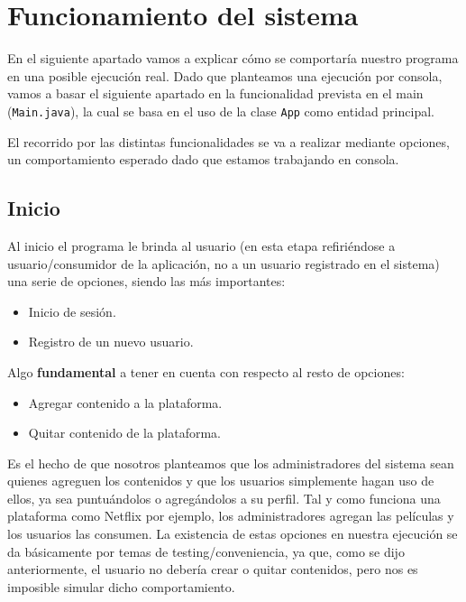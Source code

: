 ﻿\section{Funcionamiento del sistema}\label{sec:funcionamiento-del-sistema}
En el siguiente apartado vamos a explicar cómo se comportaría nuestro programa en una posible ejecución real.
Dado que planteamos una ejecución por consola, vamos a basar el siguiente apartado en la funcionalidad prevista en el
main (\lstinline|Main.java|), la cual se basa en el uso de la clase \lstinline|App| como entidad principal.

El recorrido por las distintas funcionalidades se va a realizar mediante opciones, un comportamiento esperado dado que
estamos trabajando en consola.

\subsection{Inicio}\label{subsec:inicio}
Al inicio el programa le brinda al usuario (en esta etapa refiriéndose a usuario/consumidor de la aplicación, no a un
usuario registrado en el sistema) una serie de opciones, siendo las más importantes:
\begin{itemize}
    \item Inicio de sesión.
    \item Registro de un nuevo usuario.
\end{itemize}
Algo \textbf{fundamental} a tener en cuenta con respecto al resto de opciones:
\begin{itemize}
    \item Agregar contenido a la plataforma.
    \item Quitar contenido de la plataforma.
\end{itemize}
Es el hecho de que nosotros planteamos que los administradores del sistema sean quienes agreguen los contenidos y que los
usuarios simplemente hagan uso de ellos, ya sea puntuándolos o agregándolos a su perfil.
Tal y como funciona una plataforma como Netflix por ejemplo, los administradores agregan las películas y los usuarios las
consumen.
La existencia de estas opciones en nuestra ejecución se da básicamente por temas de testing/conveniencia, ya que, como se
dijo anteriormente, el usuario no debería crear o quitar contenidos, pero nos es imposible simular dicho comportamiento.

